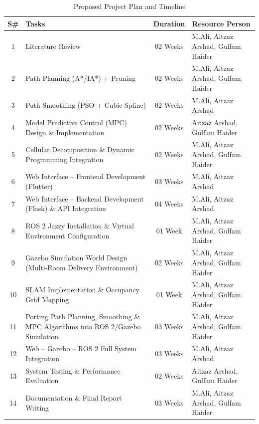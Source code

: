 \begin{table}[H]
	\centering
	\caption{Proposed Project Plan and Timeline}
	\label{tab:project_plan}
	\begin{tabular}{|c|p{6cm}|c|p{5cm}|}
		\hline
		\textbf{S\#} & \textbf{Tasks} & \textbf{Duration} & \textbf{Resource Person} \\
		\hline
		1 & Literature Review & 02 Weeks & M.Ali, Aitzaz Arshad, Gulfam Haider \\
		\hline
		2 & Path Planning (A*/IA*) + Pruning & 02 Weeks & M.Ali, Aitzaz Arshad, Gulfam Haider \\
		\hline
		3 & Path Smoothing (PSO + Cubic Spline) & 02 Weeks & M.Ali, Aitzaz Arshad \\
		\hline
		4 & Model Predictive Control (MPC) Design \& Implementation & 02 Weeks & Aitzaz Arshad, Gulfam Haider \\
		\hline
		5 & Cellular Decomposition \& Dynamic Programming Integration & 02 Weeks & M.Ali, Aitzaz Arshad, Gulfam Haider \\
		\hline
		6 & Web Interface -- Frontend Development (Flutter) & 03 Weeks & M.Ali, Aitzaz Arshad \\
		\hline
		7 & Web Interface -- Backend Development (Flask) \& API Integration & 04 Weeks & M.Ali, Aitzaz Arshad \\
		\hline
		8 & ROS 2 Jazzy Installation \& Virtual Environment Configuration & 01 Week & M.Ali, Aitzaz Arshad, Gulfam Haider \\
		\hline
		9 & Gazebo Simulation World Design (Multi-Room Delivery Environment) & 02 Weeks & M.Ali, Aitzaz Arshad, Gulfam Haider \\
		\hline
		10 & SLAM Implementation \& Occupancy Grid Mapping & 01 Week & M.Ali, Aitzaz Arshad, Gulfam Haider \\
		\hline
		11 & Porting Path Planning, Smoothing \& MPC Algorithms into ROS 2/Gazebo Simulation & 03 Weeks & M.Ali, Aitzaz Arshad, Gulfam Haider \\
		\hline
		12 & Web -- Gazebo -- ROS 2 Full System Integration & 03 Weeks & M.Ali, Aitzaz Arshad \\
		\hline
		13 & System Testing \& Performance Evaluation & 02 Weeks & Aitzaz Arshad, Gulfam Haider \\
		\hline
		14 & Documentation \& Final Report Writing & 03 Weeks & M.Ali, Aitzaz Arshad, Gulfam Haider \\
		\hline
	\end{tabular}
\end{table}

